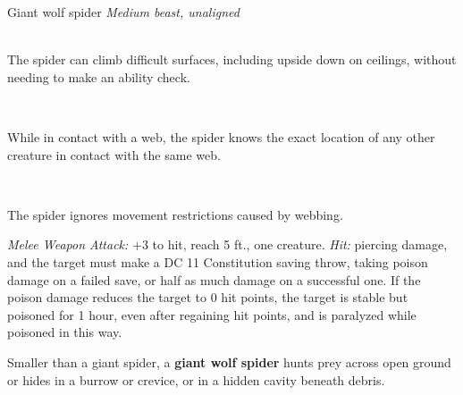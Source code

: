 \documentclass[10pt,twoside,twocolumn,openany]{book}
\begin{document}
\begin{monsterboxnobg}{Giant wolf spider}
	\textit{Medium beast, unaligned}\\
	\hline
	\basics[
		armorclass	= 13,
		hitpoints 		= \dice{2d8 + 2},
		speed		= {40 ft., climb 40 ft.}
	]
	\hline
	\stats[
		STR	= \stat{12},
		DEX	= \stat{16},
		CON	= \stat{13},
		INT	= \stat{3},
		WIS	= \stat{12},
		CHA	= \stat{4}
	]
	\hline
	\details[
		skills			= {Perception +3, Stealth +7},
		senses		= {blindsight 10 ft., darkvision 60 ft., passive Perception 13},
		languages		= {-},
		challenge		= 1/4
	]
	\hline \\[1mm]
	\begin{monsteraction}
		The spider can climb difficult surfaces, including upside down on ceilings, without needing to make an ability check.
	\end{monsteraction}\\
	\begin{monsteraction}
		While in contact with a web, the spider knows the exact location of any other creature in contact with the same web.
	\end{monsteraction}\\
	\begin{monsteraction}
		The spider ignores movement restrictions caused by webbing.
	\end{monsteraction}
	\begin{monsteraction}[Bite]
		\textit{Melee Weapon Attack:} +3 to hit, reach 5 ft., one creature. \textit{Hit:}  piercing damage, and the target must make a DC 11 Constitution saving throw, taking  poison damage on a failed save, or half as much damage on a successful one. If the poison damage reduces the target to 0 hit points, the target is stable but poisoned for 1 hour, even after regaining hit points, and is paralyzed while poisoned in this way.
	\end{monsteraction}
	
	Smaller than a giant spider, a \textbf{giant wolf spider} hunts prey across open ground or hides in a burrow or crevice, or in a hidden cavity beneath debris.
\end{monsterboxnobg}
\end{document}
